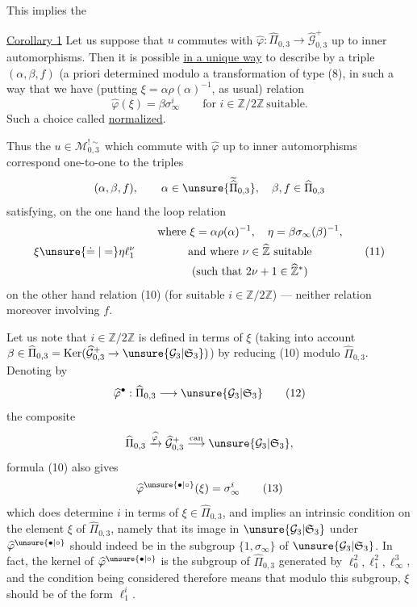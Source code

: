 
This implies the

\uline{Corollary 1} Let us suppose that $u$ commutes with
$\widehat\varphi:\widehat\Pi_{0,3}\longrightarrow
\widehat{\mathcal G}_{0,3}^{+}$ up to inner automorphisms. Then it is possible
\uline{in a unique way} to describe  by a triple
$(\alpha,\beta,f)$ (a priori determined modulo a transformation of type (8),
in such a way that we have (putting $\xi=\alpha\rho(\alpha)^{-1}$,
as usual)  relation
\[
\boxed{\widehat\varphi(\xi)=\beta\sigma_\infty^i}
\qquad\text{for }i\in\mathbb Z/2\mathbb Z\ \text{suitable}.
\tag{10}
\]
Such a choice  called \uline{normalized}.

Thus the $u\in\mathcal M_{0,3}^{!\sim}$ which commute with
$\widehat\varphi$ up to inner automorphisms correspond one-to-one to the
 triples 
\[
(\alpha,\beta,f),\qquad
\alpha\in\unsure{\widetilde{\widehat\Pi}_{0,3}},\quad
\beta,f\in\widehat\Pi_{0,3}
\]
satisfying, on the one hand the loop relation
\[
\xi\unsure{\doteq|=}\eta\ell_1^\nu
\qquad
\begin{gathered}
\text{where }\xi=\alpha\rho(\alpha)^{-1},\quad
\eta=\beta\sigma_\infty(\beta)^{-1},\\
\text{and where }\nu\in\widehat{\mathbb Z}\ \text{suitable}\\
(\text{such that }2\nu+1\in\widehat{\mathbb Z}^{*})
\end{gathered}
\tag{11}
\]
on the other hand relation (10) (for suitable $i\in\mathbb Z/2\mathbb Z$)
--- neither relation moreover involving $f$.


Let us note that $i\in\mathbb Z/2\mathbb Z$ is defined in terms of
$\xi$ (taking into account
$\beta\in\widehat\Pi_{0,3}=\operatorname{Ker}
(\widehat{\mathcal G}_{0,3}^{+}\to\unsure{\mathcal G_3|\mathfrak S_3})$)
by reducing (10) modulo $\widehat\Pi_{0,3}$. Denoting by
\[
\widehat\varphi^{\bullet}:
\widehat\Pi_{0,3}\longrightarrow\unsure{\mathcal G_3|\mathfrak S_3}
\tag{12}
\]
the composite
\[
\widehat\Pi_{0,3}\xrightarrow{\widehat\varphi}
\widehat{\mathcal G}_{0,3}^{+}
\overset{\mathrm{can}}{\longrightarrow}
\unsure{\mathcal G_3|\mathfrak S_3},
\]
formula (10) also gives
\[
\widehat\varphi^{\unsure{\bullet|\circ}}(\xi)=\sigma_\infty^i
\tag{13}
\]
which does determine $i$ in terms of
$\xi\in\widehat\Pi_{0,3}$, and implies an intrinsic condition on
the element $\xi$ of $\widehat\Pi_{0,3}$, namely that its image in
$\unsure{\mathcal G_3|\mathfrak S_3}$ under
$\widehat\varphi^{\unsure{\bullet|\circ}}$ should indeed be in the subgroup
$\{1,\sigma_\infty\}$ of $\unsure{\mathcal G_3|\mathfrak S_3}$.
In fact, the kernel of $\widehat\varphi^{\unsure{\bullet|\circ}}$ is
the  subgroup of $\widehat\Pi_{0,3}$ generated by
$\ell_0^2,\ell_1^2,\ell_\infty^3$, and the condition being considered
therefore means that modulo this subgroup, $\xi$ should be of the form $\ell_1^i$.

